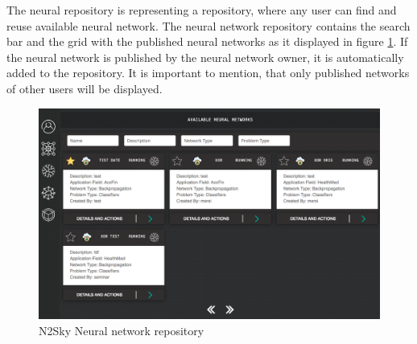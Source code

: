 The neural repository is representing a repository, where any user can find and reuse available neural network. The neural network repository contains the search bar and the grid with the published neural networks as it displayed in figure \ref{fig:nn_repository}. If the neural network is published by the neural network owner, it is automatically added to the repository. It is important to mention, that only published networks of other users will be displayed. 

\begin{figure}[H]
\begin{center}
  \includegraphics[width=\linewidth]{components/5/img/nn_repository.png}
  \caption{N2Sky Neural network repository}
  \label{fig:nn_repository}
\end{center}
\end{figure}


